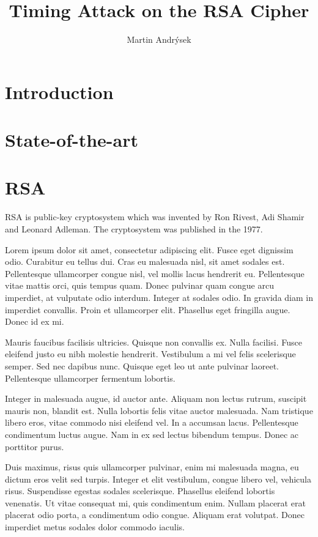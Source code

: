 \documentclass[thesis=B,english]{FITthesis}[2012/10/20]
\title{Timing Attack on the RSA Cipher}
\author{Martin Andr{\' y}sek} %
\begin{document}

\chapter{Introduction}



\chapter{State-of-the-art}

\chapter{RSA}
RSA is public-key cryptosystem which was invented by Ron Rivest, Adi Shamir and Leonard Adleman. The cryptosystem was published in the 1977.

Lorem ipsum dolor sit amet, consectetur adipiscing elit. Fusce eget dignissim odio. Curabitur eu tellus dui. Cras eu malesuada nisl, sit amet sodales est. Pellentesque ullamcorper congue nisl, vel mollis lacus hendrerit eu. Pellentesque vitae mattis orci, quis tempus quam. Donec pulvinar quam congue arcu imperdiet, at vulputate odio interdum. Integer at sodales odio. In gravida diam in imperdiet convallis. Proin et ullamcorper elit. Phasellus eget fringilla augue. Donec id ex mi.

Mauris faucibus facilisis ultricies. Quisque non convallis ex. Nulla facilisi. Fusce eleifend justo eu nibh molestie hendrerit. Vestibulum a mi vel felis scelerisque semper. Sed nec dapibus nunc. Quisque eget leo ut ante pulvinar laoreet. Pellentesque ullamcorper fermentum lobortis.

Integer in malesuada augue, id auctor ante. Aliquam non lectus rutrum, suscipit mauris non, blandit est. Nulla lobortis felis vitae auctor malesuada. Nam tristique libero eros, vitae commodo nisi eleifend vel. In a accumsan lacus. Pellentesque condimentum luctus augue. Nam in ex sed lectus bibendum tempus. Donec ac porttitor purus.

Duis maximus, risus quis ullamcorper pulvinar, enim mi malesuada magna, eu dictum eros velit sed turpis. Integer et elit vestibulum, congue libero vel, vehicula risus. Suspendisse egestas sodales scelerisque. Phasellus eleifend lobortis venenatis. Ut vitae consequat mi, quis condimentum enim. Nullam placerat erat placerat odio porta, a condimentum odio congue. Aliquam erat volutpat. Donec imperdiet metus sodales dolor commodo iaculis.
\end{document}
